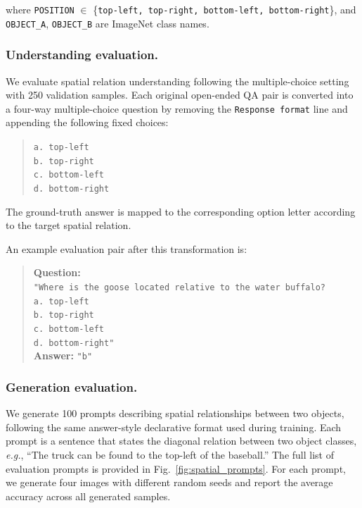 \noindent where \texttt{POSITION} $\in$ \{\texttt{top-left, top-right, bottom-left, bottom-right}\}, and \texttt{OBJECT\_A}, \texttt{OBJECT\_B} are ImageNet class names.



\subsubsection{Understanding evaluation.} 
We evaluate spatial relation understanding following the multiple-choice setting with 250 validation samples. Each original open-ended QA pair is
converted into a four-way multiple-choice question by removing the
\texttt{Response format} line and appending the following fixed choices:
\begin{quote}
\texttt{a. top-left}\\
\texttt{b. top-right}\\
\texttt{c. bottom-left}\\
\texttt{d. bottom-right}
\end{quote}
\noindent The ground-truth answer is mapped to the corresponding option
letter according to the target spatial relation.

\noindent An example evaluation pair after this transformation is:
\begin{quote}
\textbf{Question:} \\
\texttt{"Where is the goose located relative to the water buffalo?}\\
\texttt{a. top-left}\\
\texttt{b. top-right}\\
\texttt{c. bottom-left}\\
\texttt{d. bottom-right"}\\
\textbf{Answer:} \texttt{"b"}
\end{quote}


\subsubsection{Generation evaluation.} 

We generate 100 prompts describing spatial relationships between two objects, following the same answer-style declarative format used during training. Each prompt is a sentence that states the diagonal relation between two object classes, \textit{e.g.}, ``The truck can be found to the top-left of the baseball.'' The full list of evaluation prompts is provided in Fig.~\ref{fig:spatial_prompts}. For each prompt, we generate four images with different random seeds and report the average accuracy across all generated samples.

